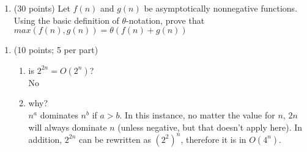 \documentclass{article}
\begin{document}
    \begin{enumerate}[label=\textbf{Q3}]
        \item (30 points) Let $f(n)$ and $g(n)$ be asymptotically nonnegative functions. Using the basic
        definition of $\theta$-notation, prove that $max(f(n),g(n))= \theta(f(n)+g(n))$
    \end{enumerate}

    \begin{enumerate}[label=\textbf{Q4}]
        \item (10 points; 5 per part)
        \begin{enumerate}[label=(\alph*)]
            \item is $2^{2n} = O(2^n)$?\\
            No
            \item why?\\
            $n^a$ dominates $n^b$ if $a > b$. In this instance, no matter the value for $n$, $2n$ will always
            dominate $n$ (unless negative, but that doesn't apply here). In addition, $2^{2n}$ can be rewritten 
            as $(2^2)^n$, therefore it is in $O(4^n)$.
        \end{enumerate}
    \end{enumerate}
\end{document}
